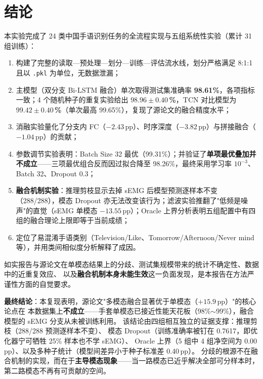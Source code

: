 \documentclass[11pt,a4paper]{ctexart}
\begin{document}
\section{结论}

本实验完成了 24 类中国手语识别任务的全流程实现与五组系统性实验（累计 31 组训练）：

\begin{enumerate}[leftmargin=2em]
\item 构建了完整的读取—预处理—划分—训练—评估流水线，划分严格满足 8:1:1 且以 \texttt{.pkl} 为单位，无数据泄漏；
\item 主模型（双分支 Bi-LSTM 融合）单次取得测试集准确率 \textbf{98.61\%}，各项指标一致；4 个随机种子的重复实验给出 \textbf{$98.96\pm0.40$\,\%}，TCN 对比模型为 \textbf{$99.42\pm0.40$\,\%}（单次最高 99.65\%），复现了源论文的融合精度水平；
\item 消融实验量化了分支内 FC（$-2.43$\,pp）、时序深度（$-3.82$\,pp）与拼接融合（$-1.04$\,pp）的贡献；
\item 参数调节实验表明：Batch Size 32 最优（99.31\%）；并验证了\textbf{单项最优叠加并不成立}——三项最优组合反而因过拟合降至 98.26\%，最终采用学习率 $10^{-3}$、Batch 32、Dropout 0.3；
\item \textbf{融合机制实验}：推理剪枝显示去掉 sEMG 后模型预测逐样本不变（288/288），模态 Dropout 亦无法改变该行为；滤波实验推翻了"低频是噪声"的直觉（sEMG 单模态 $-13.55$\,pp）；Oracle 上界分析表明五组配置中有四组的融合理论上限即等于当前成绩；
\item 定位了易混淆手语类别（Television/Like、Tomorrow/Afternoon/Never mind 等），并用类间相似度分析解释了成因。
\end{enumerate}

如实报告与源论文在单模态结果上的分歧、测试集规模带来的统计不确定性、数据中的近重复效应、
以及\textbf{融合机制本身未能生效}这一负面发现，是本报告在方法严谨性方面的自觉要求。

\vspace{4pt}
\noindent\textbf{最终结论}：本复现表明，源论文"多模态融合显著优于单模态（$+15.9$\,pp）"的核心论点在
本数据集上\textbf{不成立}——手套单模态已接近性能天花板（98\%$\sim$99\%），融合模型的 sEMG 分支从未被训练利用。
该结论由四组相互独立的证据支撑：推理剪枝（288/288 预测逐样本不变）、
模态 Dropout（训练准确率被钉在 0.7617，即优化器宁可牺牲 25\% 样本也不学 sEMG）、
Oracle 上界（5 组中 4 组净空间为 0.00\,pp）、以及多种子统计（模型间差异小于种子标准差 0.40\,pp）。
分歧的根源不在融合机制的实现，而在于\textbf{主导模态现象}——当一路模态已近乎解决全部可分样本时，
第二路模态不再有可贡献的空间。
\end{document}
